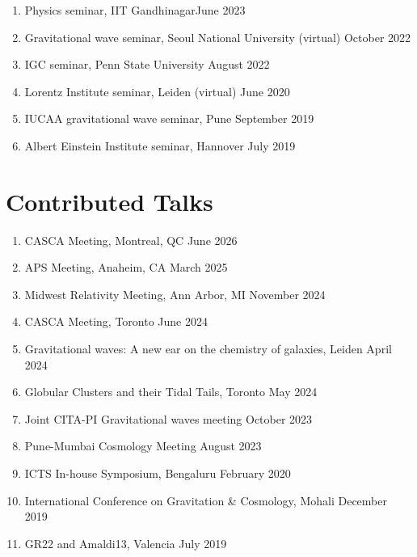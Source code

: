 \begin{enumerate}[leftmargin=*, nosep]
			\item Physics seminar, IIT Gandhinagar\hfill June 2023
			\item Gravitational wave seminar, Seoul National University (virtual) \hfill October 2022 
			\item IGC seminar, Penn State University \hfill August 2022
			\item Lorentz Institute seminar, Leiden (virtual) \hfill June 2020
			\item IUCAA gravitational wave seminar, Pune \hfill September 2019
			\item Albert Einstein Institute seminar, Hannover \hfill July 2019
		\end{enumerate}

	\section{Contributed Talks}
	\begin{enumerate}[leftmargin=*]
		\item CASCA Meeting, Montreal, QC \hfill June 2026
		\item APS Meeting, Anaheim, CA \hfill March 2025
		\item Midwest Relativity Meeting, Ann Arbor, MI \hfill November 2024
		\item CASCA Meeting, Toronto \hfill June 2024 
		\item {Gravitational waves: A new ear on the chemistry of galaxies}, Leiden \hfill April 2024
		\item {Globular Clusters and their Tidal Tails}, Toronto \hfill May 2024     
		\item {Joint CITA-PI Gravitational waves meeting} \hfill October 2023 
		\item Pune-Mumbai Cosmology Meeting \hfill August 2023
		\item {ICTS In-house Symposium}, Bengaluru \hfill February 2020 
		\item {International Conference on Gravitation \& Cosmology}, Mohali \hfill December 2019 
		\item {GR22 and Amaldi13}, Valencia \hfill July 2019 			
	\end{enumerate}

		
